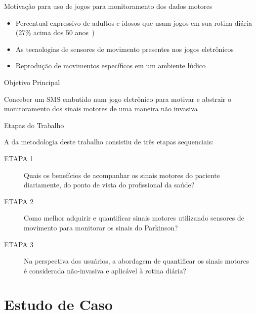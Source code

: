 \documentclass{beamer}
\begin{document}
\begin{frame}{Motivação para uso de jogos para monitoramento dos dados motores}
	\begin{block}{}
	\begin{itemize}
	    \item Percentual expressivo de adultos e idosos que usam jogos em sua rotina diária (27\% acima dos 50 anos~\cite{esa2015})
	    \item As tecnologias de sensores de movimento presentes nos jogos eletrônicos
	    \item Reprodução de movimentos específicos em um ambiente lúdico
	\end{itemize}
	\end{block}
	
\end{frame}


\begin{frame}{Objetivo Principal}
  \begin{block}{}
  Conceber um SMS embutido num jogo eletrônico para motivar e abstrair o monitoramento dos sinais motores de uma maneira não invasiva
  \end{block}
\end{frame}


\begin{frame}{Etapas do Trabalho}
	\begin{block}{}
	  A da metodologia deste trabalho consistiu de três etapas sequenciais:
		  \begin{description}
		  \item[ETAPA 1] Quais os benefícios de acompanhar os sinais motores do paciente diariamente, do ponto de vista do profissional da saúde?
		  \item[ETAPA 2] Como melhor adquirir e quantificar sinais motores utilizando sensores de movimento para monitorar os sinais do Parkinson?
		  \item[ETAPA 3] Na perspectiva dos usuários, a abordagem de quantificar os sinais motores é considerada não-invasiva e aplicável à rotina diária?
		  \end{description}
	\end{block}
\end{frame}

\section{Estudo de Caso}
\end{document}
